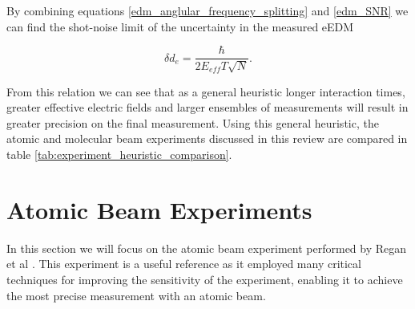 By combining equations \ref{edm_anglular_frequency_splitting} and \ref{edm_SNR} we can find the shot-noise limit of the uncertainty in the measured eEDM

\begin{equation}
    \label{shot_noise_limit}
    \delta d_e = \frac{\hbar}{2 E_{eff} T \sqrt{N}}.
\end{equation}

From this relation we can see that as a general heuristic longer interaction times, greater effective electric fields and larger ensembles of measurements will result in greater precision on the final measurement. Using this general heuristic, the atomic and molecular beam experiments discussed in this review are compared in table \ref{tab:experiment_heuristic_comparison}.

\begin{table}[h]
    \caption{\label{tab:experiment_heuristic_comparison} Comparison of the shot-noise limit for the discussed experiments.}
\end{table}

\section{Atomic Beam Experiments} \label{atomic_beams}

In this section we will focus on the atomic beam experiment performed by Regan et al \cite{Regan_2002}. This experiment is a useful reference as it employed many critical techniques for improving the sensitivity of the experiment, enabling it to achieve the most precise measurement with an atomic beam.

